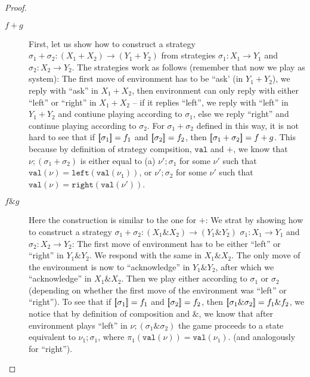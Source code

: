 \begin{proof}
\begin{description}
        \item[$f + g$] First, let us show how to construct a strategy $\sigma_1 + \sigma_2 : (X_1 + X_2) \to (Y_1 + Y_2)$ 
        from strategies $\sigma_1 : X_1 \to Y_1$ and $\sigma_2 : X_2 \to Y_2$. The strategies work as follows (remember that 
        now we play as system): The first move of environment has to be ``ask' (in $Y_1 + Y_2$), 
        we reply with ``ask'' in $X_1 + X_2$, then environment can only reply with either ``left'' or ``right''
        in $X_1 + X_2$ -- if it replies ``left'', we reply with ``left'' in $Y_1 + Y_2$ and contiune playing according to $\sigma_1$, 
        else we reply ``right'' and continue playing according to $\sigma_2$.
        For $\sigma_1 + \sigma_2$ defined in this way, it is not hard to see that if $[{\kern-0.45ex}[\sigma_1]{\kern-0.45ex}] = f_1$ and $[{\kern-0.45ex}[\sigma_2]{\kern-0.45ex}] = f_2$, 
        then $[{\kern-0.45ex}[\sigma_1 + \sigma_2]{\kern-0.45ex}] = f + g$. This because by definition of strategy compsition, $\mathtt{val}$ and $+$, 
        we know that $\nu; (\sigma_1 + \sigma_2)$ is either equal to (a) $\nu'; \sigma_1$ for some $\nu'$ 
        such that $\mathtt{val}(\nu) = \mathtt{left}(\mathtt{val(\nu_1)})$, or
        $\nu'; \sigma_2$ for some $\nu'$  such that $\mathtt{val}(\nu) = \mathtt{right}(\mathtt{val(\nu')})$. 

        \item[$f \& g$] Here the construction is similar to the one for $+$: We strat by showing 
        how to construct a strategy $\sigma_1 + \sigma_2 : (X_1 \& X_2) \to (Y_1 \& Y_2)$ 
        $\sigma_1 : X_1 \to Y_1$ and $\sigma_2 : X_2 \to Y_2$: The first move of environment has to be either 
        ``left'' or ``right'' in $Y_1 \& Y_2$. We respond with the same in $X_1 \& X_2$. The only move of 
        the environment is now to ``acknowledge'' in $Y_1 \& Y_2$, after which we ``acknowledge'' in $X_1 \& X_2$. 
        Then we play either according to $\sigma_1$ or $\sigma_2$ (depending on whether the first move of the environment
        was ``left'' or ``right''). To see that if $[{\kern-0.45ex}[\sigma_1]{\kern-0.45ex}] = f_1$ and $[{\kern-0.45ex}[\sigma_2]{\kern-0.45ex}] = f_2$, then 
        $[{\kern-0.45ex}[\sigma_1 \& \sigma_2]{\kern-0.45ex}] = f_1 \& f_2$, we notice that by definition of composition and $\&$, 
        we know that after environment plays ``left'' in $\nu; (\sigma_1 \& \sigma_2)$ the game proceeds 
        to a state equivalent to $\nu_1 ; \sigma_1$, where $\pi_1(\mathtt{val}(\nu)) = \mathtt{val}(\nu_1)$. 
        (and analogously for ``right'').


\end{description}
\end{proof}

